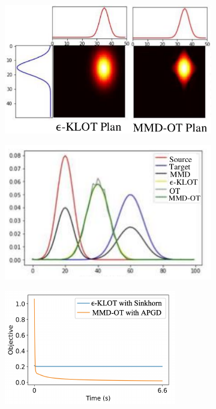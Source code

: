\begin{figure}[t]
\centering
\begin{subfigure}{.3\textwidth}
    \centering
    \includegraphics[scale=0.5]{chapter-1/images/synth1.pdf}  
    \caption{}
\end{subfigure}
\begin{subfigure}{.3\textwidth}
    \centering
    \includegraphics[scale=0.5]{chapter-1/images/synth2.pdf}  
    \caption{}
\end{subfigure}
\begin{subfigure}{.3\textwidth}
    \centering
    \includegraphics[scale=0.92]{chapter-1/images/synth3.pdf}  

\end{subfigure}
\end{figure}
